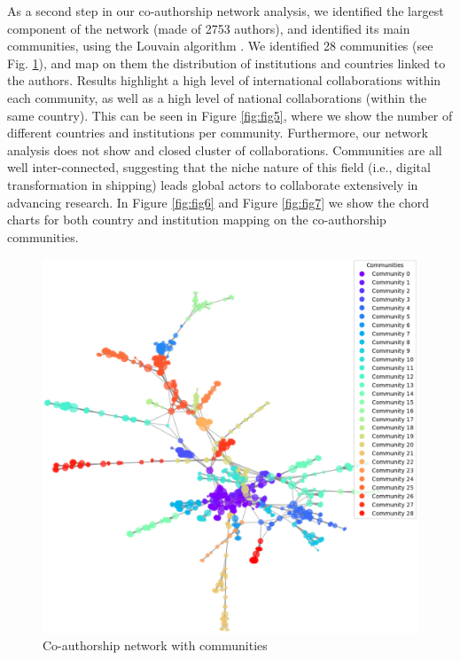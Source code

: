 \documentclass[a4paper, review, endfloat, authoryear]{elsarticle}
\begin{document}
	As a second step in our co-authorship network analysis, we identified the largest component of the network (made of 2753 authors), and identified its main communities, using the Louvain algorithm \citep{blondel2008fast}. We identified 28 communities (see Fig. \ref{fig:fig4}), and map on them the distribution of institutions and countries linked to the authors. Results highlight a high level of international collaborations within each community, as well as a high level of national collaborations (within the same country). This can be seen in Figure \ref{fig:fig5}, where we show the number of different countries and institutions per community. Furthermore, our network analysis does not show and closed cluster of collaborations. Communities are all well inter-connected, suggesting that the niche nature of this field (i.e., digital transformation in shipping) leads global actors to collaborate extensively in advancing research. In Figure \ref{fig:fig6} and Figure \ref{fig:fig7} we show the chord charts for both country and institution mapping on the co-authorship communities.
	
	\begin{figure}[htbp]
		\centering
		\includegraphics[width=\linewidth]{pics/co-authorship_communities.eps}
		\caption{Co-authorship network with communities}\label{fig:fig4}
	\end{figure}
	
\end{document}
